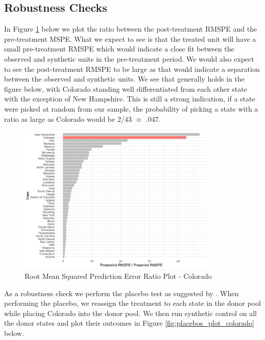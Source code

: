 \documentclass{article}
\begin{document}


\subsection{Robustness Checks}

In Figure \ref{fig:mspe_plot_colorado} below we plot the ratio between the post-treatment RMSPE and the pre-treatment MSPE. What we expect to see is that the treated unit will have a small pre-treatment RMSPE which would indicate a close fit between the observed and synthetic units in the pre-treatment period. We would also expect to see the post-treatment RMSPE to be large as that would indicate a separation between the observed and synthetic units. We see that generally holds in the figure below, with Colorado standing well differentiated from each other state with the exception of New Hampshire. This is still a strong indication, if a state were picked at random from our sample, the probability of picking a state with a ratio as large as Colorado would be 2/43 $\approx$ .047.

\begin{figure}[H]
	\begin{center}
		\includegraphics[width=0.85\textwidth]{mspe_plot_colorado}
	\end{center}
	\caption{Root Mean Squared Prediction Error Ratio Plot - Colorado}
	\label{fig:mspe_plot_colorado}
\end{figure}

As a robustness check we perform the placebo test as suggested by \citet{AbadieAlberto2010SCMf}. When performing the placebo, we reassign the treatment to each state in the donor pool while placing Colorado into the donor pool. We then run synthetic control on all the donor states and plot their outcomes in Figure \ref{fig:placebos_plot_colorado} below.
\end{document}
